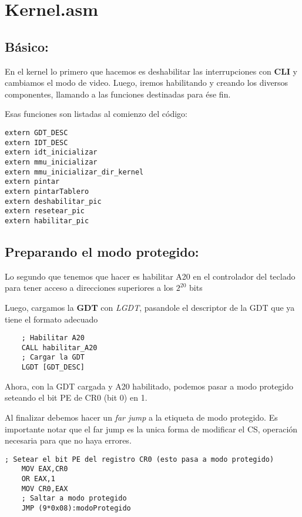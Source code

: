 
\section{Kernel.asm}

\subsection{B\'asico:}

En el kernel lo primero que hacemos es deshabilitar las interrupciones con \textbf{CLI} y cambiamos el modo de video. 
Luego, iremos habilitando y creando los diversos componentes, llamando a las funciones destinadas para \'ese fin.

Esas funciones son listadas al comienzo del c\'odigo:

\begin{codesnippet}
\begin{verbatim}
extern GDT_DESC
extern IDT_DESC 
extern idt_inicializar
extern mmu_inicializar
extern mmu_inicializar_dir_kernel
extern pintar
extern pintarTablero
extern deshabilitar_pic
extern resetear_pic
extern habilitar_pic
\end{verbatim}
\end{codesnippet}

\subsection{Preparando el modo protegido:}
Lo segundo que tenemos que hacer es habilitar A20 en el controlador del teclado para tener acceso a direcciones superiores a los $2^{20}$ bits

Luego, cargamos la \textbf{GDT} con \textit{LGDT}, pasandole el descriptor de la GDT que ya tiene el formato adecuado
\begin{codesnippet}
\begin{verbatim}
    ; Habilitar A20
    CALL habilitar_A20
    ; Cargar la GDT
    LGDT [GDT_DESC]
\end{verbatim}
\end{codesnippet}
Ahora, con la GDT cargada y A20 habilitado, podemos pasar a modo protegido seteando el bit PE de CR0 (bit 0) en 1.

Al finalizar debemos hacer un \textit{far jump} a la etiqueta de modo protegido. Es importante notar que el far jump es la unica forma de modificar el CS, operaci\'on necesaria para que no haya errores.
\begin{codesnippet}
\begin{verbatim}
; Setear el bit PE del registro CR0 (esto pasa a modo protegido)
    MOV EAX,CR0
    OR EAX,1
    MOV CR0,EAX
    ; Saltar a modo protegido
    JMP (9*0x08):modoProtegido
\end{verbatim}
\end{codesnippet}

